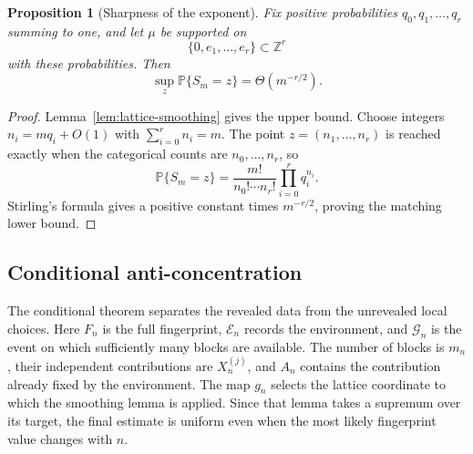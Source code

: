 \documentclass[9pt,twoside]{pnas-new}
\newtheorem{proposition}[theorem]{Proposition}
\theoremstyle{definition}
\theoremstyle{remark}
\renewcommand{\Pr}{\mathbb{P}}
\begin{document}
\begin{proposition}[Sharpness of the exponent]
\label{prop:lattice-sharpness}
Fix positive probabilities $q_0,q_1,\ldots,q_r$ summing to one, and let $\mu$ be supported on
\[
 \{0,e_1,\ldots,e_r\}\subset\mathbb Z^r
\]
with these probabilities. Then
\[
 \sup_z\Pr\{S_m=z\}=\Theta(m^{-r/2}).
\]
\end{proposition}

\begin{proof}
Lemma~\ref{lem:lattice-smoothing} gives the upper bound. Choose integers $n_i=mq_i+O(1)$ with $\sum_{i=0}^rn_i=m$. The point $z=(n_1,\ldots,n_r)$ is reached exactly when the categorical counts are $n_0,\ldots,n_r$, so
\[
 \Pr\{S_m=z\}
 =\frac{m!}{n_0!\cdots n_r!}\prod_{i=0}^rq_i^{n_i}.
\]
Stirling's formula gives a positive constant times $m^{-r/2}$, proving the matching lower bound.
\end{proof}

\subsection{Conditional anti-concentration}
The conditional theorem separates the revealed data from the unrevealed local choices. Here $F_n$ is the full fingerprint, $\mathcal E_n$ records the environment, and $\mathcal G_n$ is the event on which sufficiently many blocks are available. The number of blocks is $m_n$, their independent contributions are $X_n^{(j)}$, and $A_n$ contains the contribution already fixed by the environment. The map $g_n$ selects the lattice coordinate to which the smoothing lemma is applied. Since that lemma takes a supremum over its target, the final estimate is uniform even when the most likely fingerprint value changes with $n$.
\end{document}
